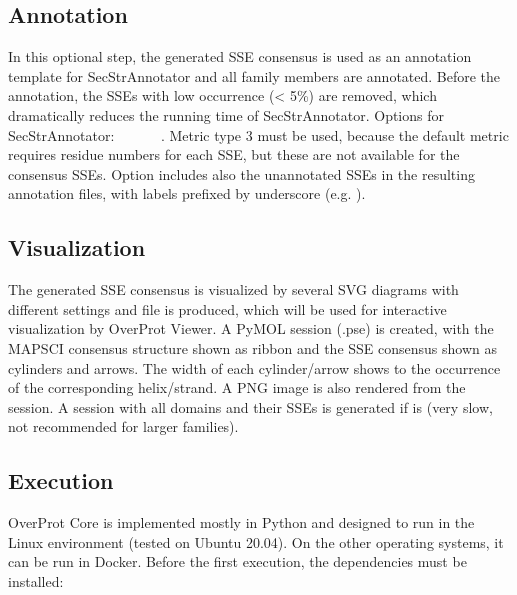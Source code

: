 \documentclass{article}
\begin{document}
\subsection{Annotation}

In this optional step, the generated SSE consensus is used
as an annotation template for SecStrAnnotator and all family members are
annotated. Before the annotation, the SSEs with low occurrence
(\textless{} 5\%) are removed, which dramatically reduces the running
time of SecStrAnnotator. Options for SecStrAnnotator:
 ~
~ ~
~. 
Metric type 3 must be used, because the default metric requires 
residue numbers for each SSE, but these are not available for the consensus SSEs. 
Option  includes also the unannotated SSEs in the resulting annotation files, 
with labels prefixed by underscore (e.g. ).



\subsection{Visualization}

The generated SSE consensus is visualized by several SVG diagrams with
different settings and  file is produced, which
will be used for interactive visualization by OverProt Viewer. 
A PyMOL session (.pse) is created, with the MAPSCI consensus structure 
shown as ribbon and the SSE consensus shown as cylinders and arrows.
The width of each cylinder/arrow shows to the occurrence of the corresponding helix/strand.
A PNG image is also rendered from the session. 
A session with all domains and their SSEs is
generated if  is
 (very slow, not recommended for larger families).



\subsection{Execution}

OverProt Core is implemented mostly in Python 
and designed to run in the Linux environment (tested on Ubuntu 20.04).
On the other operating systems, it can be run in Docker.
Before the first execution, the dependencies must be installed:
\end{document}
